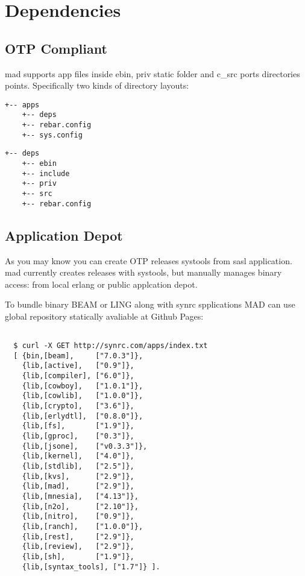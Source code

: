 \section{Dependencies}

\subsection{OTP Compliant}

mad supports app files inside ebin, priv static folder and c\_src ports directories points.
Specifically two kinds of directory layouts:

\vspace{1\baselineskip}
\begin{lstlisting}[caption=Solution]
    +-- apps
    +-- deps
    +-- rebar.config
    +-- sys.config
\end{lstlisting}
\vspace{1\baselineskip}

\vspace{1\baselineskip}
\begin{lstlisting}[caption=OTP Application]
    +-- deps
    +-- ebin
    +-- include
    +-- priv
    +-- src
    +-- rebar.config
\end{lstlisting}
\vspace{1\baselineskip}

\subsection{Application Depot}

As you may know you can create OTP releases systools from sasl application.
mad currently creates releases with systools, but manually manages binary access:
from local erlang or public applcation depot.

To bundle binary BEAM or LING along with synrc spplications MAD can use
global repository statically avaliable at Github Pages:

\vspace{1\baselineskip}
\begin{lstlisting}

  $ curl -X GET http://synrc.com/apps/index.txt
  [ {bin,[beam],     ["7.0.3"]},
    {lib,[active],   ["0.9"]},
    {lib,[compiler], ["6.0"]},
    {lib,[cowboy],   ["1.0.1"]},
    {lib,[cowlib],   ["1.0.0"]},
    {lib,[crypto],   ["3.6"]},
    {lib,[erlydtl],  ["0.8.0"]},
    {lib,[fs],       ["1.9"]},
    {lib,[gproc],    ["0.3"]},
    {lib,[jsone],    ["v0.3.3"]},
    {lib,[kernel],   ["4.0"]},
    {lib,[stdlib],   ["2.5"]},
    {lib,[kvs],      ["2.9"]},
    {lib,[mad],      ["2.9"]},
    {lib,[mnesia],   ["4.13"]},
    {lib,[n2o],      ["2.10"]},
    {lib,[nitro],    ["0.9"]},
    {lib,[ranch],    ["1.0.0"]},
    {lib,[rest],     ["2.9"]},
    {lib,[review],   ["2.9"]},
    {lib,[sh],       ["1.9"]},
    {lib,[syntax_tools], ["1.7"]} ].

\end{lstlisting}
\vspace{1\baselineskip}
